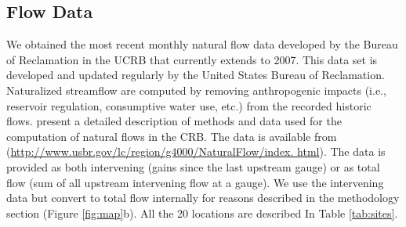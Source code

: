 \documentclass[final,5p,times,twocolumn,authoryear]{elsarticle}
\begin{document}
\subsection{Flow Data}
We obtained the most recent monthly natural flow data developed by the Bureau of Reclamation in the UCRB that currently extends to 2007. This data set is developed and updated regularly by the United States Bureau of Reclamation.  Naturalized streamflow are computed by removing anthropogenic impacts (i.e., reservoir regulation, consumptive water use, etc.) from the recorded historic flows.  \cite{Prairie:2005tl} present a detailed description of methods and data used for the computation of natural flows in the CRB. The data is available from (\url{http://www.usbr.gov/lc/region/g4000/NaturalFlow/index. html}). The data is provided as both intervening (gains since the last upstream gauge) or as total flow (sum of all upstream intervening flow at a gauge). We use the intervening data but convert to total flow internally for reasons described in the methodology section (Figure \ref{fig:map}b). All the 20 locations are described In Table \ref{tab:sites}. 
\end{document}
